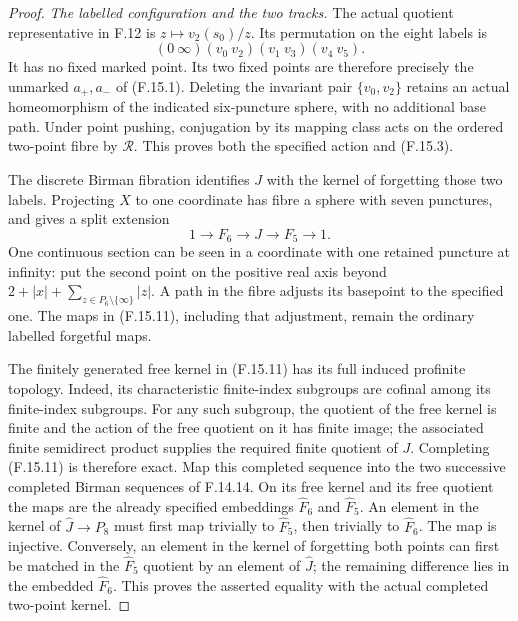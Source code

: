 \begin{proof}
\emph{The labelled configuration and the two tracks.}
The actual quotient representative in F.12 is
$z\mapsto v_2(s_0)/z$.  Its permutation on the eight
labels is
\[
       (0\ \infty)(v_0\ v_2)(v_1\ v_3)(v_4\ v_5).
                                                               \tag{F.15.10}
\]
It has no fixed marked point.  Its two fixed points are
therefore precisely the unmarked $a_+,a_-$ of (F.15.1).
Deleting the invariant pair $\{v_0,v_2\}$ retains an
actual homeomorphism of the indicated six-puncture
sphere, with no additional base path.
Under point pushing, conjugation by its mapping class
acts on the ordered two-point fibre by $\mathcal R$.
This proves both the specified action and (F.15.3).

The discrete Birman fibration identifies $J$ with the
kernel of forgetting those two labels.  Projecting $X$
to one coordinate has fibre a sphere with seven
punctures, and gives a split extension
\[
              1\longrightarrow F_6
                \longrightarrow J
                \longrightarrow F_5
                \longrightarrow1 .                            \tag{F.15.11}
\]
One continuous section can be seen in a coordinate with
one retained puncture at infinity: put the second point
on the positive real axis beyond
$2+|x|+\sum_{z\in P_6\setminus\{\infty\}}|z|$.
A path in the fibre adjusts its basepoint to the
specified one.  The maps in (F.15.11), including that
adjustment, remain the ordinary labelled forgetful maps.

The finitely generated free kernel in (F.15.11) has its
full induced profinite topology.  Indeed, its
characteristic finite-index subgroups are cofinal among
its finite-index subgroups.  For any such subgroup, the
quotient of the free kernel is finite and the action of
the free quotient on it has finite image; the associated
finite semidirect product supplies the required finite
quotient of $J$.  Completing (F.15.11) is therefore
exact.
Map this completed sequence into the two successive
completed Birman sequences of F.14.14.  On its free
kernel and its free quotient the maps are the already
specified embeddings $\widehat F_6$ and $\widehat F_5$.
An element in the kernel of $\widehat J\to P_8$ must
first map trivially to $\widehat F_5$, then trivially to
$\widehat F_6$.  The map is injective.
Conversely, an element in the kernel of forgetting both
points can first be matched in the $\widehat F_5$
quotient by an element of $\widehat J$; the remaining
difference lies in the embedded $\widehat F_6$.
This proves the asserted equality with the actual
completed two-point kernel.


\end{proof}
